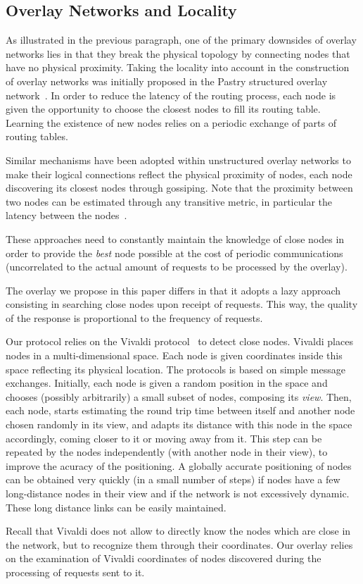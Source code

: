 
\subsection{Overlay Networks and Locality}

As illustrated in the previous paragraph, one of the primary downsides of overlay networks
lies in that they break the physical topology by connecting nodes that have no physical
proximity.
%
Taking the locality into account in the construction of overlay networks was initially
proposed in the Pastry structured overlay network~\cite{pastry}. In order to reduce the
latency of the routing process, each node is given the opportunity to choose the closest
nodes to fill its routing table. Learning the existence of new nodes relies on a periodic
exchange of parts of routing tables.

Similar mechanisms have been adopted within unstructured overlay networks to make their
logical connections reflect the physical proximity of nodes, each node discovering its
closest nodes through gossiping. Note that the proximity between two nodes can be
estimated through any transitive metric, in particular the latency between the
nodes~\cite{tman}.

These approaches need to constantly maintain the knowledge of close nodes in order to
provide the \emph{best} node possible at the cost of periodic communications (uncorrelated
to the actual amount of requests to be processed by the overlay).

The overlay we propose in this paper differs in that it adopts a lazy approach consisting
in searching close nodes upon receipt of requests. This way, the quality of the response
is proportional to the frequency of requests.

Our protocol relies on the Vivaldi protocol~\cite{dabek:2001:sigcomm04} to detect close
nodes. Vivaldi places nodes in a multi-dimensional space. Each node is given coordinates
inside this space reflecting its physical location. The protocols is based on simple
message exchanges. Initially, each node is given a random position in the space and
chooses (possibly arbitrarily) a small subset of nodes, composing its \emph{view}. Then,
each node, starts estimating the round trip time between itself and another node chosen
randomly in its view, and adapts its distance with this node in the space accordingly,
coming closer to it or moving away from it. This step can be repeated by the nodes
independently (with another node in their view), to improve the acuracy of the
positioning. A globally accurate positioning of nodes can be obtained very quickly (in a
small number of steps) if nodes have a few long-distance nodes in their view and if the
network is not excessively dynamic. These long distance links can be easily maintained.

Recall that Vivaldi does not allow to directly know the nodes which are close in the
network, but to recognize them through their coordinates. Our overlay relies on the
examination of Vivaldi coordinates of nodes discovered during the processing of requests
sent to it.







